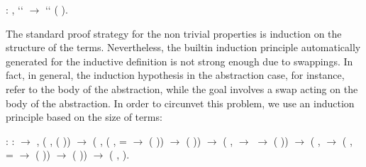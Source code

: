 \begin{coqdoccode}
\coqdocnoindent
{}  : \coqdockw{\ensuremath{\forall}}   ,  ``   \ensuremath{\rightarrow}  ``  (   ).\coqdoceol
\coqdocemptyline
\coqdocemptyline
\end{coqdoccode}
The standard proof strategy for the non trivial properties is induction on the structure of the terms. Nevertheless, the builtin induction principle automatically generated for the inductive definition  is not strong enough due to swappings. In fact, in general, the induction hypothesis in the abstraction case, for instance, refer to the body of the abstraction, while the goal involves a swap acting on the body of the abstraction. In order to circunvet this problem, we use an induction principle based on the size of terms: 
\begin{coqdoccode}
\coqdocemptyline
\coqdocnoindent
{} :\coqdoceol
\coqdocindent{0.50em}
\coqdockw{\ensuremath{\forall}}  :  \ensuremath{\rightarrow} ,\coqdoceol
\coqdocindent{0.50em}
(\coqdockw{\ensuremath{\forall}} ,  ( )) \ensuremath{\rightarrow}\coqdoceol
\coqdocindent{0.50em}
(\coqdockw{\ensuremath{\forall}}  , (\coqdockw{\ensuremath{\forall}}   ,   =   \ensuremath{\rightarrow}  (   )) \ensuremath{\rightarrow}  (  )) \ensuremath{\rightarrow}\coqdoceol
\coqdocindent{0.50em}
(\coqdockw{\ensuremath{\forall}}  ,   \ensuremath{\rightarrow}   \ensuremath{\rightarrow}  (  )) \ensuremath{\rightarrow}\coqdoceol
\coqdocindent{0.50em}
(\coqdockw{\ensuremath{\forall}}   ,   \ensuremath{\rightarrow} (\coqdockw{\ensuremath{\forall}}   ,   =   \ensuremath{\rightarrow}  (   )) \ensuremath{\rightarrow}  (   )) \ensuremath{\rightarrow} \coqdoceol
\coqdocindent{0.50em}
(\coqdockw{\ensuremath{\forall}} ,  ).\coqdoceol
\coqdocemptyline
\end{coqdoccode}
